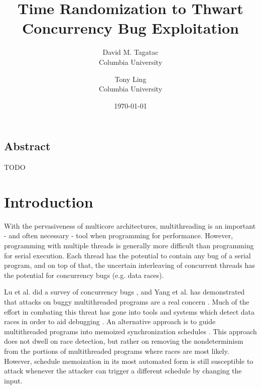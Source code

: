\documentclass[letterpaper,twocolumn,10pt]{article}
\begin{document}
\date{\today}

\title{\Large \bf Time Randomization to Thwart Concurrency Bug Exploitation}

\author{
{\rm David M. Tagatac}\\
Columbia University
\and
{\rm Tony Ling}\\
Columbia University
} %

\maketitle



\subsection*{Abstract}
TODO


\section{Introduction}
With the pervasiveness of multicore architectures, multithreading is an important - and often necessary - tool when programming for performance.  However, programming with multiple threads is generally more difficult than programming for serial execution.  Each thread has the potential to contain any bug of a serial program, and on top of that, the uncertain interleaving of concurrent threads has the potential for concurrency bugs (e.g. data races).

Lu et al. did a survey of concurrency bugs \cite{Lu2008}, and Yang et al. has demonstrated that attacks on buggy multithreaded programs are a real concern \cite{Yang2011}.  Much of the effort in combating this threat has gone into tools and systems which detect data races in order to aid debugging \cite{Savage1997, Flanagan2004, Laadan2011, Pratikakis2011, Kasikci2013}.  An alternative approach is to guide multithreaded programs into memoized synchronization schedules \cite{Cui2011}.  This approach does not dwell on race detection, but rather on removing the nondeterminism from the portions of multithreaded programs where races are most likely.  However, schedule memoization in its most automated form is still susceptible to attack whenever the attacker can trigger a different schedule by changing the input.
\end{document}
